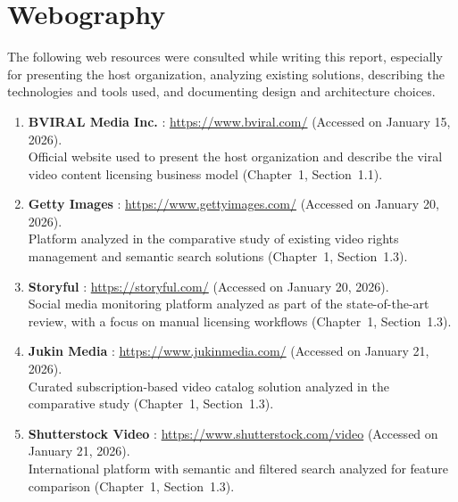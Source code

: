 \chapter*{Webography}
\label{chap:webographie}
\pagestyle{empty}

The following web resources were consulted while writing this report, especially for presenting
the host organization, analyzing existing solutions, describing the technologies and tools used,
and documenting design and architecture choices.

\begin{enumerate}[leftmargin=0pt]

  \item \label{web:bviral} \textbf{BVIRAL Media Inc.} :
        \url{https://www.bviral.com/} (Accessed on January 15, 2026).\\
        Official website used to present the host organization and describe the viral video
        content licensing business model (Chapter~1, Section~1.1).

  \item \label{web:getty} \textbf{Getty Images} :
        \url{https://www.gettyimages.com/} (Accessed on January 20, 2026).\\
        Platform analyzed in the comparative study of existing video rights management and semantic
        search solutions (Chapter~1, Section~1.3).

  \item \label{web:storyful} \textbf{Storyful} :
        \url{https://storyful.com/} (Accessed on January 20, 2026).\\
        Social media monitoring platform analyzed as part of the state-of-the-art review, with a
        focus on manual licensing workflows (Chapter~1, Section~1.3).

  \item \label{web:jukin} \textbf{Jukin Media} :
        \url{https://www.jukinmedia.com/} (Accessed on January 21, 2026).\\
        Curated subscription-based video catalog solution analyzed in the comparative study
        (Chapter~1, Section~1.3).

  \item \label{web:shutterstock} \textbf{Shutterstock Video} :
        \url{https://www.shutterstock.com/video} (Accessed on January 21, 2026).\\
        International platform with semantic and filtered search analyzed for feature comparison
        (Chapter~1, Section~1.3).


\end{enumerate}
